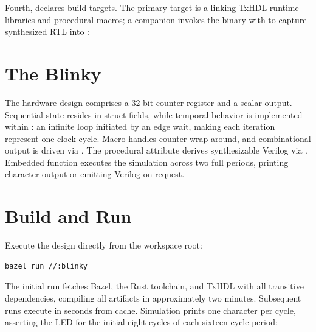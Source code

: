 \documentclass[journal,9pt]{IEEEtran}
\begin{document}


Fourth,  declares build targets. The primary target is a
 linking TxHDL runtime libraries and procedural macros; a
companion  invokes the binary with  to capture
synthesized RTL into :



\section{The Blinky}
\label{sec:z-blinky}

The hardware design comprises a 32-bit counter register and a scalar output.
Sequential state resides in struct fields, while temporal behavior is
implemented within : an infinite loop initiated by an edge
wait, making each iteration represent one clock cycle. Macro 
handles counter wrap-around, and combinational output  is driven via
. The procedural attribute \code{\#[lower]} derives synthesizable
Verilog via . Embedded function  executes the
simulation across two full periods, printing character output or emitting
Verilog on request.



\section{Build and Run}
\label{sec:z-run}

Execute the design directly from the workspace root:

\begin{lstlisting}[style=ascii]
bazel run //:blinky
\end{lstlisting}

The initial run fetches Bazel, the Rust toolchain, and TxHDL with all
transitive dependencies, compiling all artifacts in approximately two minutes.
Subsequent runs execute in seconds from cache. Simulation prints one character
per cycle, asserting the LED for the initial eight cycles of each sixteen-cycle
period:
\end{document}
